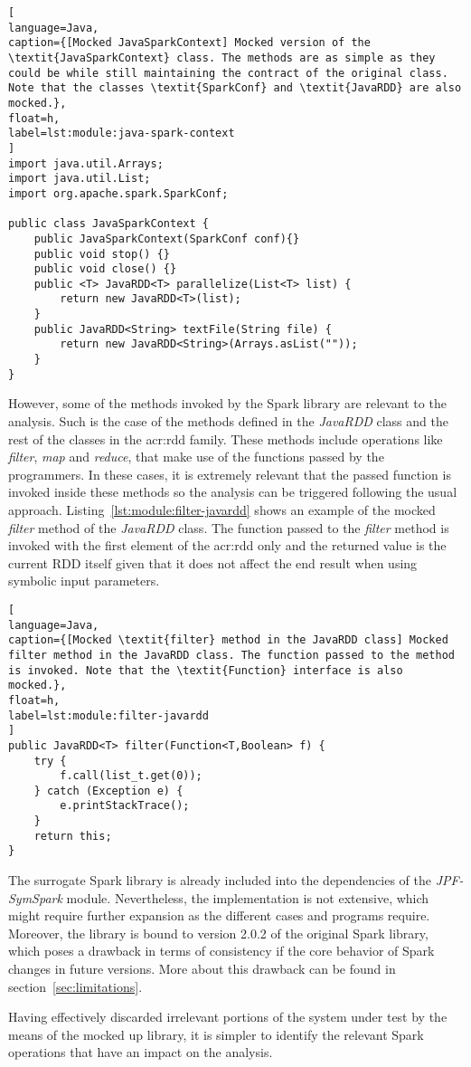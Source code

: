\begin{lstlisting}[
language=Java,
caption={[Mocked JavaSparkContext] Mocked version of the \textit{JavaSparkContext} class. The methods are as simple as they could be while still maintaining the contract of the original class. Note that the classes \textit{SparkConf} and \textit{JavaRDD} are also mocked.},
float=h,
label=lst:module:java-spark-context
]
import java.util.Arrays;
import java.util.List;
import org.apache.spark.SparkConf;

public class JavaSparkContext {	
	public JavaSparkContext(SparkConf conf){}
	public void stop() {}	
	public void close() {}
	public <T> JavaRDD<T> parallelize(List<T> list) {		
		return new JavaRDD<T>(list);
	}
	public JavaRDD<String> textFile(String file) {
		return new JavaRDD<String>(Arrays.asList(""));
	}
}
\end{lstlisting}

However, some of the methods invoked by the Spark library are relevant to the analysis. Such is the case of the methods defined in the \textit{JavaRDD} class and the rest of the classes in the \acrshort{acr:rdd} family. These methods include operations like \textit{filter}, \textit{map} and \textit{reduce}, that make use of the functions passed by the programmers. In these cases, it is extremely relevant that the passed function is invoked inside these methods so the analysis can be triggered following the usual \spf{} approach. Listing~\ref{lst:module:filter-javardd} shows an example of the mocked \textit{filter} method of the \textit{JavaRDD} class. The function passed to the \textit{filter} method is invoked with the first element of the \acrshort{acr:rdd} only and the returned value is the current RDD itself given that it does not affect the end result when using symbolic input parameters.

\begin{lstlisting}[
language=Java,
caption={[Mocked \textit{filter} method in the JavaRDD class] Mocked filter method in the JavaRDD class. The function passed to the method is invoked. Note that the \textit{Function} interface is also mocked.},
float=h,
label=lst:module:filter-javardd
]
public JavaRDD<T> filter(Function<T,Boolean> f) {		
	try {
		f.call(list_t.get(0));
	} catch (Exception e) {
		e.printStackTrace();
	}
	return this;
}
\end{lstlisting}

The surrogate Spark library is already included into the dependencies of the \textit{JPF-SymSpark} module. Nevertheless, the implementation is not extensive, which might require further expansion as the different cases and programs require. Moreover, the library is bound to version 2.0.2 of the original Spark library, which poses a drawback in terms of consistency if the core behavior of Spark changes in future versions. More about this drawback can be found in section~\ref{sec:limitations}.

Having effectively discarded irrelevant portions of the system under test by the means of the mocked up library, it is simpler to identify the relevant Spark operations that have an impact on the analysis.